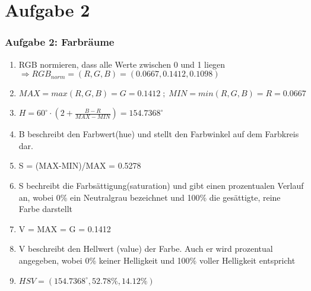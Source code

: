 \documentclass[accentcolor=tud9c,colorbacktitle,inverttitle,landscape,german,presentation,t]{tudbeamer}
\begin{document}
\section{Aufgabe 2}
	\begin{frame}
		\frametitle{Aufgabe 2: Farbräume}
			\begin{enumerate}
			\item RGB normieren, dass alle Werte zwischen 0 und 1 liegen
			$\Rightarrow RGB_{norm} = (R, G, B) = (0.0667, 0.1412, 0.1098)$
			\item $MAX = max(R, G, B) = G = 0.1412 \; ; \; MIN = min(R, G, B) = R = 0.0667$
			\item  $H = 60 ^{\circ} \cdot (2 + \frac{B-R}{MAX-MIN}) = 154.7368^{\circ}$
			\item  B beschreibt den Farbwert(hue) und stellt den Farbwinkel auf dem Farbkreis dar.
			\item S = (MAX-MIN)/MAX = 0.5278
			\item S bechreibt die Farbsättigung(saturation) und gibt einen prozentualen Verlauf an, wobei 0\% ein Neutralgrau bezeichnet und 100\% die gesättigte, reine Farbe darstellt \
			\item V = MAX = G = 0.1412
			\item V beschreibt den Hellwert (value) der Farbe. Auch er wird prozentual angegeben, wobei 0\% keiner Helligkeit und 100\% voller Helligkeit entspricht
			\item $HSV = (154.7368^{\circ}, 52.78\%, 14.12\%)$
			\end{enumerate}
		\end{frame}
\end{document}
